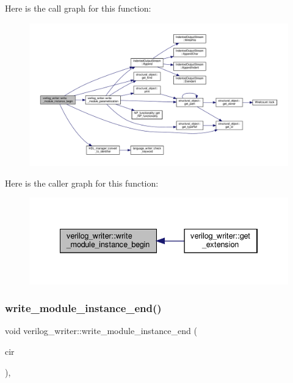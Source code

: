 Here is the call graph for this function\+:
\nopagebreak
\begin{figure}[H]
\begin{center}
\leavevmode
\includegraphics[width=350pt]{d8/dba/classverilog__writer_a1e0cb32347eba52c36780f6f179dfa6c_cgraph}
\end{center}
\end{figure}
Here is the caller graph for this function\+:
\nopagebreak
\begin{figure}[H]
\begin{center}
\leavevmode
\includegraphics[width=334pt]{d8/dba/classverilog__writer_a1e0cb32347eba52c36780f6f179dfa6c_icgraph}
\end{center}
\end{figure}
\mbox{\label{classverilog__writer_ac10a9da13d7ad6c60d862998383a3695}} 
\subsubsection{\texorpdfstring{write\+\_\+module\+\_\+instance\+\_\+end()}{write\_module\_instance\_end()}}
{\footnotesize\ttfamily void verilog\+\_\+writer\+::write\+\_\+module\+\_\+instance\+\_\+end (\begin{DoxyParamCaption}\item[{const \hyperlink{structural__objects_8hpp_a8ea5f8cc50ab8f4c31e2751074ff60b2}{structural\+\_\+object\+Ref} \&}]{cir }\end{DoxyParamCaption})\hspace{0.3cm}{\ttfamily [override]}, {\ttfamily [virtual]}}



